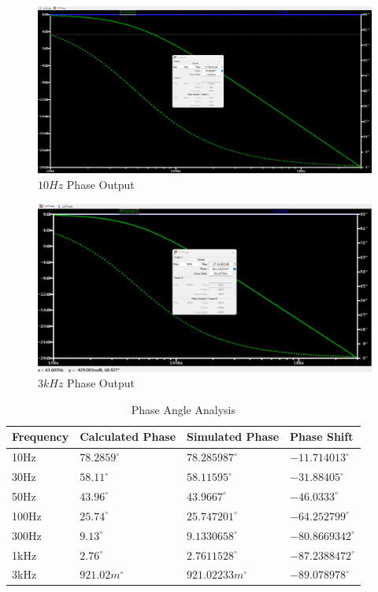 \newpage
\thispagestyle{plain}

\begin{figure}[h]
    \centering
        \includegraphics[width=0.6\linewidth]{assets/pd-10.png}
        \caption{$10Hz$ Phase Output}
        \label{fig:p2-10}
\end{figure}

\begin{figure}[h]
    \centering
        \includegraphics[width=0.6\linewidth]{assets/pd-3k.png}
        \caption{$3kHz$ Phase Output}
        \label{fig:p2-3k}
\end{figure}

\begin{table}[h]
    \centering
    \begin{tabular}{|l|l|l|l|}
        \hline
        \textbf{Frequency} & \textbf{Calculated Phase} & \textbf{Simulated Phase} & \textbf{Phase Shift} \\ \hline
        10Hz                 & $78.2859^{\circ}$           & $78.285987^{\circ}$      & $-11.714013   ^{\circ}$                          \\ \hline
        30Hz                 & $58.11^{\circ}$             & $58.11595^{\circ}$       & $-31.88405    ^{\circ}$                      \\ \hline
        50Hz                 & $43.96^{\circ}$             & $43.9667^{\circ}$        & $-46.0333     ^{\circ}$                  \\ \hline
        100Hz                & $25.74^{\circ}$             & $25.747201^{\circ}$      & $-64.252799   ^{\circ}$                      \\ \hline
        300Hz                & $9.13^{\circ}$              & $9.1330658^{\circ}$      & $-80.8669342  ^{\circ}$                       \\ \hline
        1kHz                 & $2.76^{\circ}$              & $2.7611528^{\circ}$      & $-87.2388472  ^{\circ}$                     \\ \hline
        3kHz                 & $921.02m^{\circ}$           & $921.02233m^{\circ}$     & $-89.078978   ^{\circ}$                    \\ \hline
    \end{tabular}
    \caption{Phase Angle Analysis}
\end{table}

